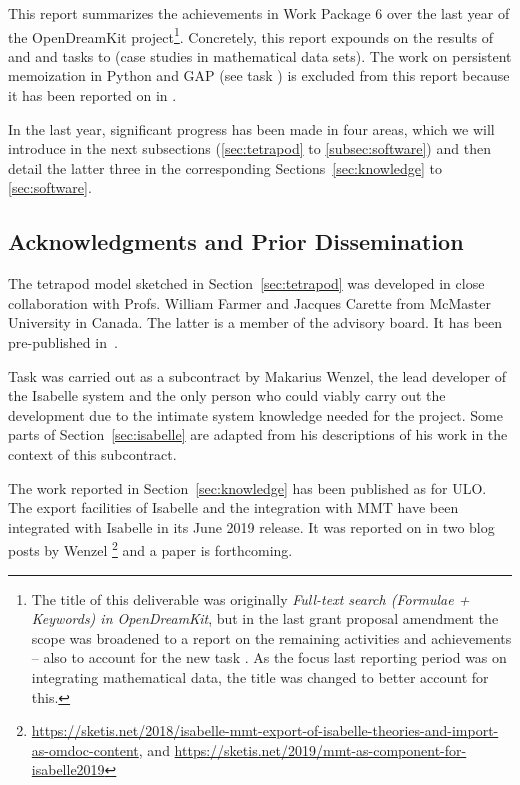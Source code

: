 This report summarizes the achievements in Work Package 6 over the last year of the OpenDreamKit project\footnote{The title of this deliverable was originally \emph{Full-text search (Formulae + Keywords) in OpenDreamKit}, but in the last grant proposal amendment the scope was broadened to a report on the remaining  activities and achievements -- also to account for the new task . As the focus last reporting period was on integrating mathematical data, the title was changed to better account for this.}. Concretely, this report expounds on the results of  and  and tasks  to  (case studies in mathematical data sets). The work on persistent memoization in Python and GAP (see task ) is excluded from this report because it has been reported on in .

In the last year, significant progress has been made in four areas, which we will introduce in the next subsections (\ref{sec:tetrapod} to \ref{subsec:software}) and then detail the latter three in the corresponding Sections~\ref{sec:knowledge} to \ref{sec:software}.






\subsection{Acknowledgments and Prior Dissemination}
The tetrapod model sketched in Section~\ref{sec:tetrapod} was developed in close collaboration with Profs. William Farmer and Jacques Carette from McMaster University in Canada.
The latter is a member of the \pn advisory board. It has been pre-published in~\cite{CarFarKohRab:bmobb19}.

Task  was carried out as a subcontract by Makarius Wenzel, the lead developer of the Isabelle system and the only person who could viably carry out the development due to the intimate system knowledge needed for the project.
Some parts of Section~\ref{sec:isabelle} are adapted from his descriptions of his work in the context of this subcontract.

The work reported in Section~\ref{sec:knowledge} has been published as \cite{ConKohMue:rdaml19} for ULO.
The export facilities of Isabelle and the integration with MMT have been integrated with Isabelle in its June 2019 release.
It was reported on in two blog posts by Wenzel%
\footnote{\url{https://sketis.net/2018/isabelle-mmt-export-of-isabelle-theories-and-import-as-omdoc-content}, and \url{https://sketis.net/2019/mmt-as-component-for-isabelle2019}}
and a paper is forthcoming.


